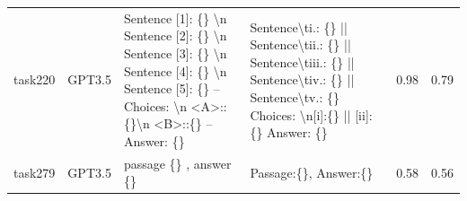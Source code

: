\begin{longtable}{@{}p{0.8cm\tiny}p{1cm\tiny}p{4.1cm\ttfamily\tiny}p{4.1cm\ttfamily\tiny}p{0.8cm\tiny}p{0.8cm\tiny}@{}}
task220   & GPT3.5    & Sentence {[}1{]}: \{\} \textbackslash{}n Sentence {[}2{]}: \{\} \textbackslash{}n Sentence {[}3{]}: \{\} \textbackslash{}n Sentence {[}4{]}: \{\} \textbackslash{}n Sentence {[}5{]}: \{\} -- Choices: \textbackslash{}n \textless{}A\textgreater{}::\{\}\textbackslash{}n \textless{}B\textgreater{}::\{\} -- Answer: \{\}                                                                                                                                                                                             & Sentence\textbackslash{}ti.: \{\} || Sentence\textbackslash{}tii.: \{\} || Sentence\textbackslash{}tiii.: \{\} || Sentence\textbackslash{}tiv.: \{\} || Sentence\textbackslash{}tv.: \{\}  Choices:  \textbackslash{}n{[}i{]}:\{\} || {[}ii{]}:\{\}  Answer: \{\}                                                                                                                                                                                                                                                                                                                 & 0.98 & 0.79 \\
task279   & GPT3.5    & passage \{\} ,  answer \{\}                                                                                                                                                                                                                                                                                                                                                                                                                                                                                             & Passage:\{\}, Answer:\{\}                                                                                                                                                                                                                                                                                                                                                                                                                                                                                                                                                         & 0.58 & 0.56 \\

\end{longtable}
